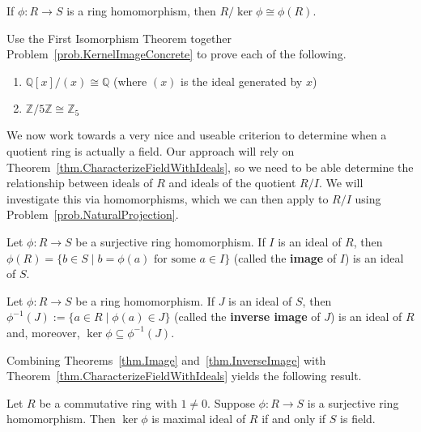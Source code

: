\begin{theorem}\label{thm.FirstIsoRings}
If $\phi:R\to S$ is a ring homomorphism, then  $R/\ker \phi\cong \phi(R)$.
\end{theorem}

\begin{problem}
Use the First Isomorphism Theorem together Problem~\ref{prob.KernelImageConcrete} to prove each of the following. 
\begin{enumerate}
\item $\mathbb{Q}[x]/(x) \cong \mathbb{Q}$ (where $(x)$ is the ideal generated by $x$)
\item $\mathbb{Z}/5\mathbb{Z} \cong \mathbb{Z}_5$
\end{enumerate}
\end{problem}

We now work towards a very nice and useable criterion to determine when a quotient ring is actually a field. Our approach will rely on Theorem~\ref{thm.CharacterizeFieldWithIdeals}, so we need to be able determine the relationship between ideals of $R$ and ideals of the quotient $R/I$. We will investigate this via homomorphisms, which we can then apply to $R/I$ using Problem~\ref{prob.NaturalProjection}.

\begin{theorem}\label{thm.Image}
Let $\phi:R\to S$ be a surjective ring homomorphism. If $I$ is an ideal of $R$, then $\phi(R)=\{b\in S\mid b=\phi(a) \text{ for some $a\in I$}\}$ (called the \textbf{image} of $I$) is an ideal of $S$.
\end{theorem}

\begin{theorem}\label{thm.InverseImage}
Let $\phi:R\to S$ be a ring homomorphism. If $J$ is an ideal of $S$, then $\phi^{-1}(J) := \{a\in R\mid\phi(a) \in J\}$ (called the \textbf{inverse image} of $J$) is an ideal of $R$ and, moreover,  $\ker\phi \subseteq \phi^{-1}(J)$.
\end{theorem}

Combining Theorems~\ref{thm.Image} and~\ref{thm.InverseImage} with Theorem~\ref{thm.CharacterizeFieldWithIdeals} yields the following result.

\begin{theorem}
Let $R$ be a commutative ring with $1\neq0$. Suppose $\phi:R\to S$ is a surjective ring homomorphism. Then $\ker\phi$ is maximal ideal of $R$ if and only if $S$ is field.
\end{theorem}


